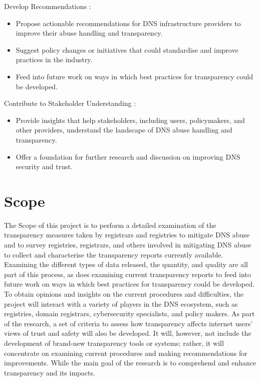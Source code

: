 Develop Recommendations :

\begin{itemize}
  \item Propose actionable recommendations for DNS infrastructure providers to improve their abuse handling and transparency.
  \item Suggest policy changes or initiatives that could standardise and improve practices in the industry.
  \item Feed into future work on ways in which best practices for transparency could be developed.
\end{itemize}

Contribute to Stakeholder Understanding : 

\begin{itemize}
  \item Provide insights that help stakeholders, including users, policymakers, and other providers, understand the landscape of DNS abuse handling and transparency.
  \item Offer a foundation for further research and discussion on improving DNS security and trust.
\end{itemize}

\section{Scope}	
The Scope of this project is to perform a detailed examination of the transparency measures taken by registrars and registries to mitigate DNS abuse and to survey registries, registrars, and others involved in mitigating DNS abuse to collect and characterise the transparency reports currently available. Examining the different types of data released, the quantity, and quality are all part of this process, as does examining current transparency reports to feed into future work on ways in which best practices for transparency could be developed. To obtain opinions and insights on the current procedures and difficulties, the project will interact with a variety of players in the DNS ecosystem, such as registries, domain registrars, cybersecurity specialists, and policy makers. As part of the research, a set of criteria to assess how transparency affects internet users' views of trust and safety will also be developed. It will, however, not include the development of brand-new transparency tools or systems; rather, it will concentrate on examining current procedures and making recommendations for improvements. While the main goal of the research is to comprehend and enhance transparency and its impacts. 

